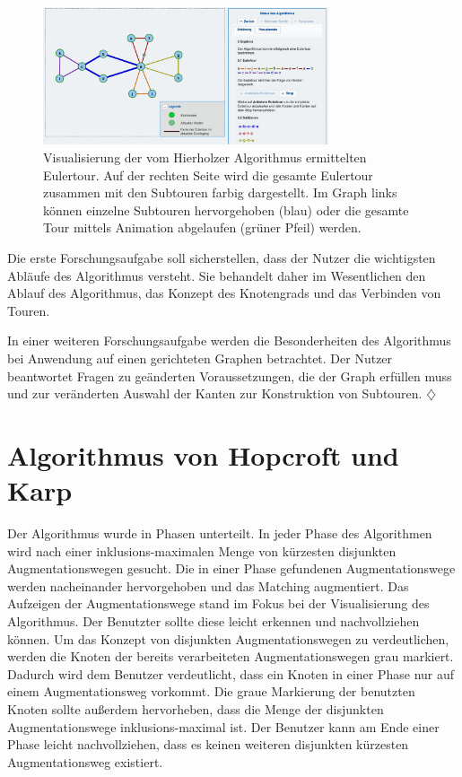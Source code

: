 \begin{figure}[h!]
	\centering
	\includegraphics[width=0.75\textwidth]{figures/hierholzer_animation}
	\caption[Hierholzer: Eulertour Animation]{Visualisierung der vom Hierholzer Algorithmus ermittelten Eulertour. Auf der rechten Seite wird die gesamte Eulertour zusammen mit den Subtouren farbig dargestellt. Im Graph links können einzelne Subtouren hervorgehoben (blau) oder die gesamte Tour mittels Animation abgelaufen (grüner Pfeil) werden.}\label{fig:hierholzer-animation}
\end{figure}

Die erste Forschungsaufgabe soll sicherstellen, dass der Nutzer die wichtigsten Abläufe des Algorithmus versteht. Sie behandelt daher im Wesentlichen den Ablauf des Algorithmus, das Konzept des Knotengrads und das Verbinden von Touren.

In einer weiteren Forschungsaufgabe werden die Besonderheiten des Algorithmus bei Anwendung auf einen gerichteten Graphen betrachtet. Der Nutzer beantwortet Fragen zu geänderten Voraussetzungen, die der Graph erfüllen muss und zur veränderten Auswahl der Kanten zur Konstruktion von Subtouren. \hfill$\diamondsuit$
     
\section{Algorithmus von Hopcroft und Karp} %
Der Algorithmus wurde in Phasen unterteilt. In jeder Phase des Algorithmen wird nach einer inklusions-maximalen Menge von kürzesten disjunkten Augmentationswegen gesucht. Die in einer Phase gefundenen Augmentationswege werden nacheinander hervorgehoben und das Matching augmentiert.
Das Aufzeigen der Augmentationswege stand im Fokus bei der Visualisierung des Algorithmus. Der Benutzter sollte diese leicht erkennen und nachvollziehen können. Um das Konzept von disjunkten Augmentationswegen zu verdeutlichen, werden die Knoten der bereits verarbeiteten Augmentationswegen grau markiert. Dadurch wird dem Benutzer verdeutlicht, dass ein Knoten in einer Phase nur auf einem Augmentationsweg vorkommt. 
Die graue Markierung der benutzten Knoten sollte außerdem hervorheben, dass die Menge der disjunkten Augmentationswege inklusions-maximal ist. Der Benutzer kann am Ende einer Phase leicht nachvollziehen, dass es keinen weiteren disjunkten kürzesten Augmentationsweg existiert.

